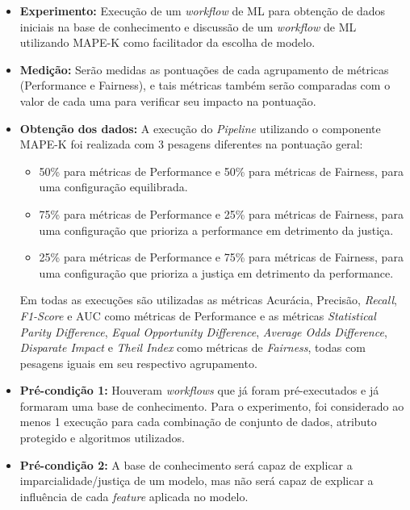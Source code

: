 \documentclass[portugues]{ic-tese}
\begin{document}
\begin{itemize}
\item \textbf{Experimento:} Execução de um \textit{workflow} de ML para obtenção de dados iniciais na base de conhecimento e discussão de um \textit{workflow} de ML utilizando MAPE-K como facilitador da escolha de modelo.

\item \textbf{Medição:} Serão medidas as pontuações de cada agrupamento de métricas (Performance e Fairness), e tais métricas também serão comparadas com o valor de cada uma para verificar seu impacto na pontuação.

\item \textbf{Obtenção dos dados:} A execução do \textit{Pipeline} utilizando o componente MAPE-K foi realizada com 3 pesagens diferentes na pontuação geral:

\begin{itemize}
\item 50\% para métricas de Performance e 50\% para métricas de Fairness, para uma configuração equilibrada.
\item 75\% para métricas de Performance e 25\% para métricas de Fairness, para uma configuração que prioriza a performance em detrimento da justiça.
\item 25\% para métricas de Performance e 75\% para métricas de Fairness, para uma configuração que prioriza a justiça em detrimento da performance.
\end{itemize}

Em todas as execuções são utilizadas as métricas Acurácia, Precisão, \textit{Recall}, \textit{F1-Score} e AUC como métricas de Performance e as métricas \textit{Statistical Parity Difference}, \textit{Equal Opportunity Difference}, \textit{Average Odds Difference}, \textit{Disparate Impact} e \textit{Theil Index} como métricas de \textit{Fairness}, todas com pesagens iguais em seu respectivo agrupamento.

\item \textbf{Pré-condição 1:} Houveram \textit{workflows} que já foram pré-executados e já formaram uma base de conhecimento. Para o experimento, foi considerado ao menos 1 execução para cada combinação de conjunto de dados, atributo protegido e algoritmos utilizados.

\item \textbf{Pré-condição 2:} A base de conhecimento será capaz de explicar a imparcialidade/justiça de um modelo, mas não será capaz de explicar a influência de cada \textit{feature} aplicada no modelo.


\end{itemize}
\end{document}
